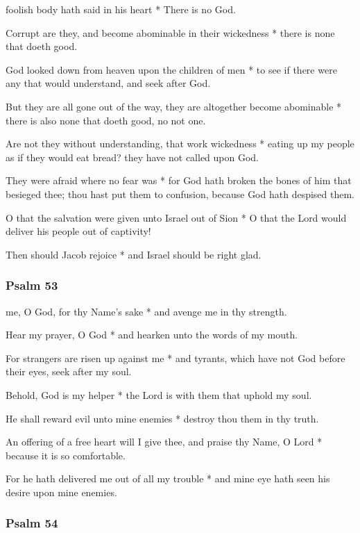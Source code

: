  foolish body hath said in his heart * There is no God.

Corrupt are they, and become abominable in their wickedness * there is none that doeth good.

God looked down from heaven upon the children of men * to see if there were any that would understand, and seek after God.

But they are all gone out of the way, they are altogether become abominable * there is also none that doeth good, no not one.

Are not they without understanding, that work wickedness * eating up my people as if they would eat bread? they have not called upon God.

They were afraid where no fear was * for God hath broken the bones of him that besieged thee; thou hast put them to confusion, because God hath despised them.

O that the salvation were given unto Israel out of Sion * O that the Lord would deliver his people out of captivity!

Then should Jacob rejoice * and Israel should be right glad.

\subsubsection{Psalm 53}


 me, O God, for thy Name's sake * and avenge me in thy strength.

Hear my prayer, O God * and hearken unto the words of my mouth.

For strangers are risen up against me * and tyrants, which have not God before their eyes, seek after my soul.

Behold, God is my helper * the Lord is with them that uphold my soul.

He shall reward evil unto mine enemies * destroy thou them in thy truth.

An offering of a free heart will I give thee, and praise thy Name, O Lord * because it is so comfortable.

For he hath delivered me out of all my trouble * and mine eye hath seen his desire upon mine enemies.

\subsubsection{Psalm 54}

